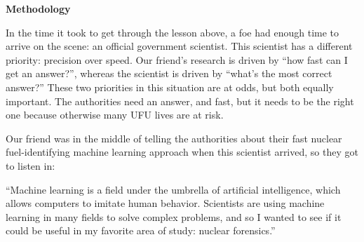 {\begin{tcolorbox}[halign=center]
\textbf{Methodology}
\end{tcolorbox}

\begin{shadequote}

  In the time it took to get through the lesson above, a foe had enough time to
  arrive on the scene: an official government scientist. This scientist has a
  different priority: precision over speed. Our friend's research is driven by
  ``how fast can I get an answer?'', whereas the scientist is driven by
  ``what's the most correct answer?'' These two priorities in this situation
  are at odds, but both equally important. The authorities need an answer, and
  fast, but it needs to be the right one because otherwise many UFU lives are
  at risk.
  
  Our friend was in the middle of telling the authorities about their fast
  nuclear fuel-identifying machine learning approach when this scientist
  arrived, so they got to listen in:
  
  ``Machine learning is a field under the umbrella of artificial intelligence,
  which allows computers to imitate human behavior. Scientists are using
  machine learning in many fields to solve complex problems, and so I wanted to
  see if it could be useful in my favorite area of study: nuclear forensics.''
  
\end{shadequote}

}
